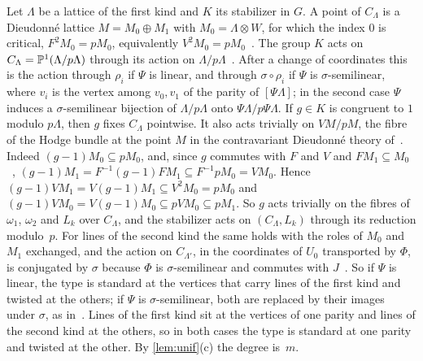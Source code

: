 \begin{informalproof}
Let $\Lambda$ be a lattice of the first kind and $K$ its stabilizer in $G$. A point of $C_\Lambda$ is a Dieudonn\'e
lattice $M=M_0\oplus M_1$ with $M_0=\Lambda\otimes W$, for which the index $0$ is critical, $F^2M_0=pM_0$, equivalently
$V^2M_0=pM_0$~\cite[Definition~4.1, Lemma~4.3 and~(4.9)]{KudlaRapoport1999}. The group $K$ acts on
$C_\Lambda=\mathbb{P}^1(\Lambda/p\Lambda)$ through its action on $\Lambda/p\Lambda$~\cite[Lemma~4.3]{KudlaRapoport1999}. After a
change of coordinates this is the action through $\rho_i$ if $\Psi$ is linear, and through $\sigma\circ\rho_i$ if $\Psi$
is $\sigma$-semilinear, where $v_i$ is the vertex among $v_0,v_1$ of the parity of $[\Psi\Lambda]$; in the second case
$\Psi$ induces a $\sigma$-semilinear bijection of $\Lambda/p\Lambda$ onto $\Psi\Lambda/p\Psi\Lambda$. If $g\in K$ is congruent to $1$ modulo $p\Lambda$, then $g$ fixes $C_\Lambda$ pointwise. It
also acts trivially on $VM/pM$, the fibre of the Hodge bundle at the point $M$ in the contravariant Dieudonn\'e theory
of~\cite{KudlaRapoport1999}. Indeed $(g-1)M_0\subseteq pM_0$, and, since $g$ commutes with $F$ and $V$
and $FM_1\subseteq M_0$~\cite[(4.6)]{KudlaRapoport1999}, $(g-1)M_1=F^{-1}(g-1)FM_1\subseteq F^{-1}pM_0=VM_0$. Hence
$(g-1)VM_1=V(g-1)M_1\subseteq V^2M_0=pM_0$ and $(g-1)VM_0=V(g-1)M_0\subseteq pVM_0\subseteq pM_1$. So $g$ acts
trivially on the fibres of $\omega_1$, $\omega_2$ and $L_k$ over $C_\Lambda$, and the stabilizer acts on $(C_\Lambda,L_k)$
through its reduction modulo~$p$. For lines of the second kind the same holds with the roles of $M_0$ and $M_1$ exchanged,
and the action on $C_{\Lambda'}$, in the coordinates of $U_0$ transported by $\Phi$, is conjugated by $\sigma$ because
$\Phi$ is $\sigma$-semilinear and commutes with $J$~\cite[Lemma~6.9, steps (1)--(2)]{Luck2026}. So if $\Psi$ is linear,
the type is standard at the vertices that carry lines of the first kind and twisted at the others; if $\Psi$ is
$\sigma$-semilinear, both are replaced by their images under $\sigma$, as in~\cite[Lemma~6.9, step~(5)]{Luck2026}. Lines
of the first kind sit at the vertices of one parity and lines of the second kind at the others, so in both cases the type
is standard at one parity and twisted at the other. By \cref{lem:unif}(c) the degree is~$m$.
\end{informalproof}

